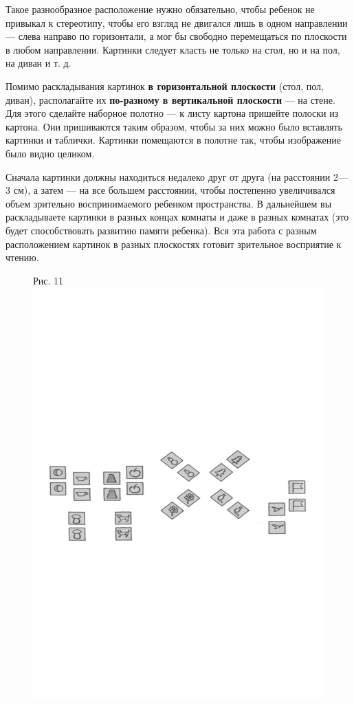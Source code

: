\documentclass[a5paper]{book}
\begin{document}
Такое разнообразное расположение нужно обязательно, чтобы ребенок не
привыкал к стереотипу, чтобы его взгляд не двигался лишь в одном
направлении --- слева направо по горизонтали, а мог бы свободно
перемещаться по плоскости в любом направлении. Картинки следует класть
не только на стол, но и на пол, на диван и т. д.

Помимо раскладывания картинок \textbf{в горизонтальной плоскости} (стол,
пол, диван), располагайте их \textbf{по-разному в вертикальной
плоскости} --- на стене. Для этого сделайте наборное полотно --- к листу
картона пришейте полоски из картона. Они пришиваются таким образом,
чтобы за них можно было вставлять картинки и таблички. Картинки
помещаются в полотне так, чтобы изображение было видно целиком.

Сначала картинки должны находиться недалеко друг от друга (на расстоянии
2---3 см), а затем --- на все большем расстоянии, чтобы постепенно
увеличивался объем зрительно воспринимаемого ребенком пространства. В
дальнейшем вы раскладываете картинки в разных концах комнаты и даже в
разных комнатах (это будет способствовать развитию памяти ребенка). Вся
эта работа с разным расположением картинок в разных плоскостях готовит
зрительное восприятие к чтению.

\begin{figure}
\centering
Рис. 11\includegraphics[width=\linewidth]{media/media/image11.png}
\end{figure}
\end{document}
